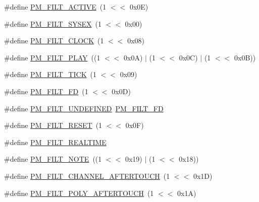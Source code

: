 \begin{DoxyCompactItemize}
\item 
\#define \hyperlink{group__grp__events__filters_ga14df46b4e5e3aa265dc8dee06df8ce19}{P\+M\+\_\+\+F\+I\+L\+T\+\_\+\+A\+C\+T\+I\+VE}~(1 $<$$<$ 0x0\+E)
\item 
\#define \hyperlink{group__grp__events__filters_ga3ef53d51914740bb7746e017b5a44402}{P\+M\+\_\+\+F\+I\+L\+T\+\_\+\+S\+Y\+S\+EX}~(1 $<$$<$ 0x00)
\item 
\#define \hyperlink{group__grp__events__filters_gaf6d54a9ff867bab06ee18bc637887834}{P\+M\+\_\+\+F\+I\+L\+T\+\_\+\+C\+L\+O\+CK}~(1 $<$$<$ 0x08)
\item 
\#define \hyperlink{group__grp__events__filters_gae8733c7af01f94015043c8926076557a}{P\+M\+\_\+\+F\+I\+L\+T\+\_\+\+P\+L\+AY}~((1 $<$$<$ 0x0\+A) $\vert$ (1 $<$$<$ 0x0\+C) $\vert$ (1 $<$$<$ 0x0\+B))
\item 
\#define \hyperlink{group__grp__events__filters_gaa4de938a93a84d9d06cc5173f4277595}{P\+M\+\_\+\+F\+I\+L\+T\+\_\+\+T\+I\+CK}~(1 $<$$<$ 0x09)
\item 
\#define \hyperlink{group__grp__events__filters_gaea41a2172d5c7382f6b9d7df85c62a7c}{P\+M\+\_\+\+F\+I\+L\+T\+\_\+\+FD}~(1 $<$$<$ 0x0\+D)
\item 
\#define \hyperlink{group__grp__events__filters_ga4ee575e9f8ba7bf24e53919cfe81edab}{P\+M\+\_\+\+F\+I\+L\+T\+\_\+\+U\+N\+D\+E\+F\+I\+N\+ED}~\hyperlink{group__grp__events__filters_gaea41a2172d5c7382f6b9d7df85c62a7c}{P\+M\+\_\+\+F\+I\+L\+T\+\_\+\+FD}
\item 
\#define \hyperlink{group__grp__events__filters_gaf398203a8c838897bd07dc356cd9ed54}{P\+M\+\_\+\+F\+I\+L\+T\+\_\+\+R\+E\+S\+ET}~(1 $<$$<$ 0x0\+F)
\item 
\#define \hyperlink{group__grp__events__filters_ga20f84601b1fc10c18339cf85bf9b91e9}{P\+M\+\_\+\+F\+I\+L\+T\+\_\+\+R\+E\+A\+L\+T\+I\+ME}
\item 
\#define \hyperlink{group__grp__events__filters_ga27d37f62f7ab2674c5c6626a15630b48}{P\+M\+\_\+\+F\+I\+L\+T\+\_\+\+N\+O\+TE}~((1 $<$$<$ 0x19) $\vert$ (1 $<$$<$ 0x18))
\item 
\#define \hyperlink{group__grp__events__filters_gaf26195f93ad34640136d893fd4729a31}{P\+M\+\_\+\+F\+I\+L\+T\+\_\+\+C\+H\+A\+N\+N\+E\+L\+\_\+\+A\+F\+T\+E\+R\+T\+O\+U\+CH}~(1 $<$$<$ 0x1\+D)
\item 
\#define \hyperlink{group__grp__events__filters_ga1b300264b36000d2f1aceb990a1aeb1d}{P\+M\+\_\+\+F\+I\+L\+T\+\_\+\+P\+O\+L\+Y\+\_\+\+A\+F\+T\+E\+R\+T\+O\+U\+CH}~(1 $<$$<$ 0x1\+A)
\item 
$$
\end{DoxyCompactItemize}
